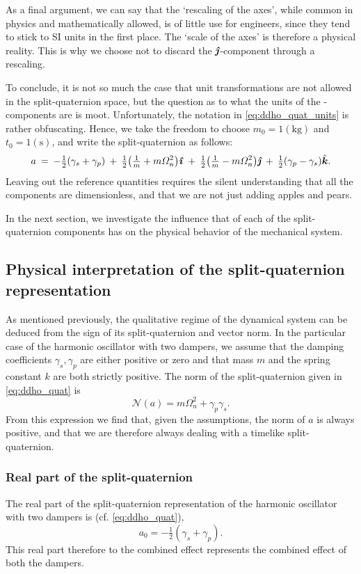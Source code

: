 As a final argument, we can say that the `rescaling of the axes', while common in physics and mathematically allowed, is of little use for engineers, since they tend to stick to SI units in the first place. The `scale of the axes' is therefore a physical reality. This is why we choose not to discard the $\quatj$-component through a rescaling.

To conclude, it is not so much the case that unit transformations are not allowed in the split-quaternion space, but the question as to what the units of the \quatj-components are is moot. Unfortunately, the notation in \cref{eq:ddho_quat_units} is rather obfuscating. Hence, we take the freedom to choose $m_0 = 1 (\si{\kilogram})$ and $t_0 = 1 (\si{\second})$, and write the split-quaternion as follows:
\begin{equation}
    a\:=\: -\tfrac{1}{2}\qty(\gamma_s + \gamma_p)\:+\:\tfrac{1}{2}\qty(\tfrac{1}{m} + m\Omega_n^2)\quati\:+\:\tfrac{1}{2}\qty(\tfrac{1}{m} - m\Omega_n^2)\quatj\:+\:\tfrac{1}{2}\qty(\gamma_p - \gamma_s)\quatk. 
    \label{eq:ddho_quat}
\end{equation}
Leaving out the reference quantities requires the silent understanding that all the components are dimensionless, and that we are not just adding apples and pears. 

In the next section, we investigate the influence that of each of the split-quaternion components has on the physical behavior of the mechanical system.

\subsection{Physical interpretation of the split-quaternion representation}
As mentioned previously, the qualitative regime of the dynamical system can be deduced from the sign of its split-quaternion and vector norm. In the particular case of the harmonic oscillator with two dampers, we assume that the damping coefficients $\gamma_s, \gamma_p$ are either positive or zero and that mass $m$ and the spring constant $k$ are both strictly positive. The norm of the split-quaternion given in \cref{eq:ddho_quat} is
$$ \mathscr{N}(a) = m \Omega_n^2 + \gamma_p \gamma_s.$$
From this expression we find that, given the assumptions, the norm of $a$ is always positive, and that we are therefore always dealing with a timelike split-quaternion. 

\subsubsection{Real part of the split-quaternion} 
The real part of the split-quaternion representation of the harmonic oscillator with two dampers is (cf. \cref{eq:ddho_quat}),
$$ a_0 = -\tfrac{1}{2}(\gamma_s + \gamma_p). $$
This real part therefore to the combined effect represents the combined effect of both the dampers.

